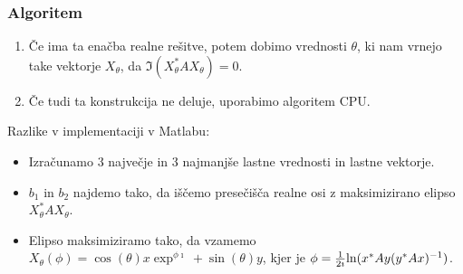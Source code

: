 \documentclass{beamer}
\newcounter{saveenumi}
\newcommand{\conti}{\setcounter{enumi}{\value{saveenumi}}}
\begin{document}
\begin{frame}
\frametitle{Algoritem}
\begin{enumerate}[1.]
\conti
\item Če ima ta enačba realne rešitve, potem dobimo vrednosti $\theta$, ki nam vrnejo take vektorje $X_\theta$, da $\Im(X_\theta ^\ast AX_\theta)=0$.\medskip
\item Če tudi ta konstrukcija ne deluje, uporabimo algoritem CPU.
\end{enumerate}
\pause
Razlike v implementaciji v Matlabu:
\begin{itemize}
\item Izračunamo 3 največje in 3 najmanjše lastne vrednosti in lastne vektorje.\pause
\item $b_1$ in $b_2$ najdemo tako, da iščemo presečišča realne osi z maksimizirano elipso $X_{\theta}^\ast A X_{\theta}$.\pause
\item Elipso maksimiziramo tako, da vzamemo $X_{\theta}(\phi) = \cos (\theta) x \exp ^{\phi \imath} + \sin (\theta)y$, kjer je $\phi = \frac{1}{2\imath}\textnormal{ln}(x^\ast Ay(y^\ast Ax)^{-1})$.
\end{itemize}



\end{frame}
\end{document}
